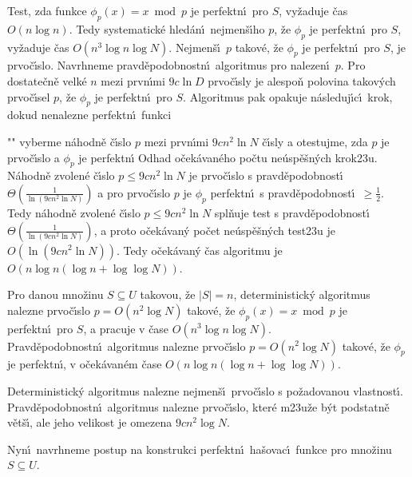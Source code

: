 \flushpar Test, zda funkce $\phi_p(x)=x\bmod p$ je perfektn\'\i\ 
pro $S$, 
vy\v zaduje \v cas $O(n\log n)$. Tedy systematick\'e hled\'an\'\i\ 
nejmen\v s\'\i ho $p$, \v ze $\phi_p$ je perfektn\'\i\ pro $S$, vy\v zaduje \v cas 
$O(n^3\log n\log N)$. Nejmen\v s\'\i\ $p$ takov\'e, \v ze $\phi_p$ je perfektn\'\i\ 
pro $S$, 
je prvo\v c\'\i slo. Navrhneme pravd\v epodob\-nostn\'\i\ algoritmus 
pro nalezen\'\i\ $p$. Pro dostate\v cn\v e velk\'e $n$ mezi 
prvn\'\i mi $9c\ln D$ prvo\v c\'\i sly je alespo\v n polovina tako\-v\'ych 
prvo\v c\'\i sel $p$, \v ze $\phi_p$ je perfektn\'\i\ pro $S$. Algoritmus pak 
opakuje n\'asleduj\'\i c\'\i\ krok, dokud nenalezne perfektn\'\i\ funkci
\roster
\item"{}"
vyberme n\'ahodn\v e \v c\'\i slo $p$ mezi prvn\'\i mi $9cn^2\ln 
N$ 
\v c\'\i sly a otestujme, zda $p$ je prvo\v c\'\i slo a $\phi_p$ je perfektn\'\i
\endroster
\flushpar Odhad o\v cek\'avan\'eho po\v ctu ne\'usp\v e\v sn\'ych krok\accent23u.\newline 
N\'ahodn\v e zvolen\'e \v c\'\i slo $p\le 9cn^2\ln N$ je prvo\v c\'\i slo s 
pravd\v epo\-dob\-nost\'\i\ $\Theta (\frac 1{\ln(9cn^2\ln N)})$ a pro prvo\v c\'\i slo $
p$ je $\phi_p$ 
perfektn\'\i\ s prav\-d\v e\-po\-dob\-nost\'\i\ $\ge\frac 12$. Tedy n\'ahodn\v e zvolen\'e 
\v c\'\i slo $p\le 9cn^2\ln N$ spl\v nuje test s pravd\v e\-po\-dob\-nost\'\i\ 
$\Theta (\frac 1{\ln(9cn^2\ln N)})$, a proto o\v cek\'a\-va\-n\'y po\v cet ne\'usp\v e\v sn\'ych 
test\accent23u je $O(\ln(9cn^2\ln N))$. Tedy o\v cek\'a\-van\'y \v cas 
algoritmu je $O(n\log n(\log n+\log\log N))$.

\proclaim{V\v eta}Pro danou mno\v zinu $S\subseteq U$ takovou, \v ze 
$|S|=n$, deterministick\'y algoritmus nalezne prvo\v c\'\i slo 
$p=O(n^2\log N)$ takov\'e, \v ze $\phi_p(x)=x\bmod p$ je perfektn\'\i\ 
pro $S$, a pracuje v \v case $O(n^3\log n\log N)$. Pravd\v epodobnostn\'\i\ 
algoritmus nalezne pr\-vo\v c\'\i slo $p=O(n^2\log N)$ takov\'e, \v ze 
$\phi_p$ je perfektn\'\i , v o\v cek\'ava\-n\'em \v case 
$O(n\log n(\log n+\log\log N))$.
\endproclaim

\flushpar Deterministick\'y algoritmus nalezne nejmen\v s\'\i\ prvo\v c\'\i slo s 
po\-\v za\-dovanou vlastnost\'\i .  Prav\-d\v e\-podobnostn\'\i\ algoritmus 
nalezne prvo\v c\'\i slo, kter\'e m\accent23u\v ze b\'yt podstatn\v e 
v\v et\v s\'\i , ale jeho velikost je omezena $9cn^2\log N$. 
\medskip

\flushpar Nyn\'\i\ navrhneme postup na konstrukci perfektn\'\i\ 
ha\v sovac\'\i\ funk\-ce pro mno\v zinu $S\subseteq U$.

